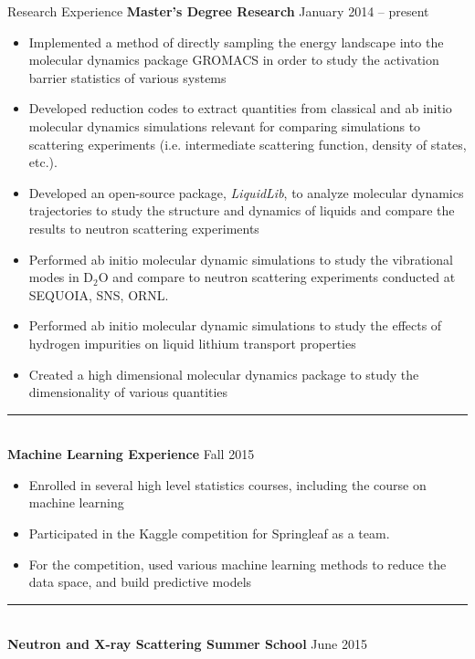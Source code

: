 \documentclass{resume} %
\begin{document}


\begin{rSection}{Research Experience}
	{\bf Master's Degree Research} \hfill {January 2014 -- present}
	\begin{itemize}
	\item Implemented a method of directly sampling the energy landscape into the molecular dynamics package GROMACS in order to study the activation barrier statistics of various systems
	\item Developed reduction codes to extract quantities from classical and ab initio molecular dynamics simulations relevant for comparing simulations to scattering experiments (i.e. intermediate scattering function, density of states, etc.).
	\item Developed an open-source package, \textit{LiquidLib}, to analyze molecular dynamics trajectories to study the structure and dynamics of liquids and compare the results to neutron scattering experiments 
	\item Performed ab initio molecular dynamic simulations to study the vibrational modes in D$_2$O and compare to neutron scattering experiments conducted at SEQUOIA, SNS, ORNL. 
	\item Performed ab initio molecular dynamic simulations to study the effects of hydrogen impurities on liquid lithium transport properties
	\item Created a high dimensional molecular dynamics package to study the dimensionality of various quantities
	\end{itemize}
	{\centering\noindent\rule{5cm}{0.4pt}}
	\\
	{\bf Machine Learning Experience} \hfill {Fall 2015}
	\begin{itemize}
		\item Enrolled in several high level statistics courses, including the course on machine learning
		\item Participated in the Kaggle competition for Springleaf as a team. 
		\item For the competition, used various machine learning methods to reduce the data space, and build predictive models
	\end{itemize}
	{\centering\noindent\rule{5cm}{0.4pt}}
	\\
	{\bf Neutron and X-ray Scattering Summer School} \hfill {June 2015}

\end{rSection}
\end{document}
